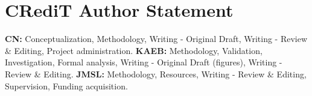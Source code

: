 \section*{CRediT Author Statement}

    \textbf{CN:} Conceptualization, Methodology, Writing - Original Draft, Writing -  Review  \&
    Editing, Project  administration.  \textbf{KAEB:}  Methodology,  Validation,  Investigation,
    Formal  analysis,  Writing  -  Original  Draft  (figures),  Writing  -  Review  \&  Editing.
    \textbf{JMSL:} Methodology, Resources, Writing - Review  \&  Editing,  Supervision,  Funding
    acquisition.


